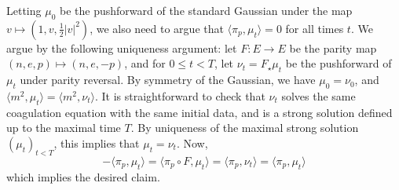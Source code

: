  Letting $\mu_0$ be the pushforward of the standard Gaussian under the map $v\mapsto (1,v,\frac{1}{2}|v|^2)$, we also need to argue that $\langle \pi_p, \mu_t\rangle=0$ for all times $t$. We argue by the following uniqueness argument: let $F: E\rightarrow E$ be the parity map $(n,e,p)\mapsto(n,e,-p)$, and for $0\leq t<T$, let $\nu_t=F_\star\mu_t$ be the pushforward of $\mu_t$ under parity reversal. By symmetry of the Gaussian, we have $\mu_0=\nu_0$, and $\langle m^2, \mu_t\rangle=\langle m^2, \nu_t\rangle.$ It is straightforward to check that $\nu_t$ solves the same coagulation equation with the same initial data, and is a strong solution defined up to the maximal time $T$. By uniqueness of the maximal strong solution $(\mu_t)_{t<T}$, this implies that $\mu_t=\nu_t.$ Now, \begin{equation*}
    -\langle \pi_p, \mu_t\rangle = \langle \pi_p\circ F, \mu_t\rangle = \langle \pi_p, \nu_t \rangle = \langle \pi_p, \mu_t\rangle
\end{equation*} which implies the desired claim.
